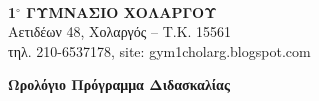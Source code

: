 \documentclass[a4paper,landscape,2pt]{book}
\begin{document}
\gr

\begin{minipage}{2.5cm}
    \ %
\end{minipage}
\begin{minipage}{20cm}
\begin{center}
{\LARGE \textbf{1$^\circ$ ΓΥΜΝΑΣΙΟ ΧΟΛΑΡΓΟΥ}} \\
    Αετιδέων 48, Χολαργός  -- T.K. 15561 \\
    τηλ. 210-6537178, {\en site: gym1cholarg.blogspot.com} %

\bigskip
    {\Large \textbf{Ωρολόγιο Πρόγραμμα Διδασκαλίας}}
\end{center}
\end{minipage}
\begin{minipage}{2.5cm}
\end{minipage}
\end{document}

